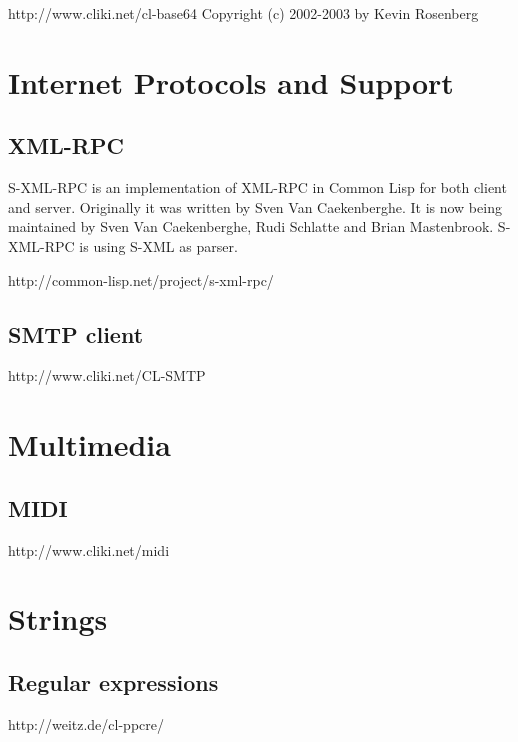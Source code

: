 \documentclass[10pt,english]{book}
\begin{document}
http://www.cliki.net/cl-base64
Copyright (c) 2002-2003 by Kevin Rosenberg



\chapter{Internet Protocols and Support}
\label{cha:intern-prot-supp}

\section{XML-RPC}
\label{sec:xml-rpc}

S-XML-RPC is an implementation of XML-RPC in Common Lisp for both
client and server. Originally it was written by Sven Van Caekenberghe.
It is now being maintained by Sven Van Caekenberghe, Rudi Schlatte and
Brian Mastenbrook. S-XML-RPC is using S-XML as parser.

http://common-lisp.net/project/s-xml-rpc/

\section{SMTP client}
\label{sec:smtp-client}

http://www.cliki.net/CL-SMTP



\chapter{Multimedia}
\label{cha:multimedia}

\section{MIDI}
\label{sec:midi}

http://www.cliki.net/midi


\chapter{Strings}
\label{cha:strings-1}

\section{Regular expressions}
\label{sec:regular-expressions}

http://weitz.de/cl-ppcre/

\end{document}
